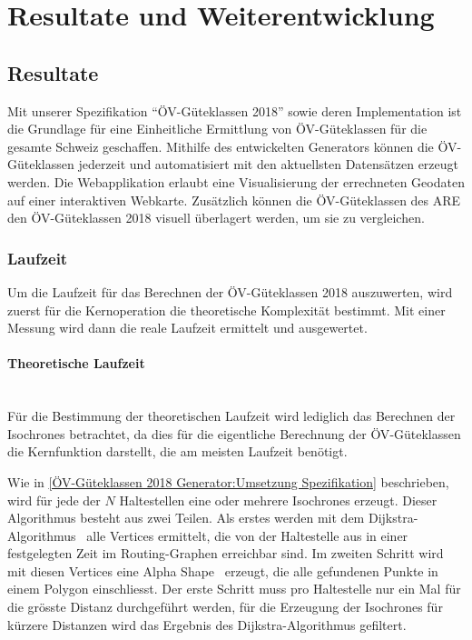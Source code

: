 
\section{Resultate und Weiterentwicklung}
\label{Resultate und Weiterentwicklung}


\subsection{Resultate}
\label{Resultate und Weiterentwicklung:Resultate}

Mit unserer Spezifikation "`\acs{ÖV}-Güteklassen 2018"' sowie deren Implementation ist die Grundlage für eine Einheitliche Ermittlung von \acs{ÖV}-Güteklassen für die gesamte Schweiz geschaffen.
Mithilfe des entwickelten Generators können die \acs{ÖV}-Güteklassen jederzeit und automatisiert mit den aktuellsten Datensätzen erzeugt werden.
Die Webapplikation erlaubt eine Visualisierung der errechneten Geodaten auf einer interaktiven Webkarte.
Zusätzlich können die \acs{ÖV}-Güteklassen des \ac{ARE} den \acs{ÖV}-Güteklassen 2018 visuell überlagert werden, um sie zu vergleichen.


\subsubsection{Laufzeit}
\label{Resultate und Weiterentwicklung:Laufzeit}

Um die Laufzeit für das Berechnen der \acs{ÖV}-Güteklassen 2018 auszuwerten, wird zuerst für die Kernoperation die theoretische Komplexität bestimmt.
Mit einer Messung wird dann die reale Laufzeit ermittelt und ausgewertet.

\paragraph{Theoretische Laufzeit}\label{Laufzeit:Theoretische Laufzeit}~\\
Für die Bestimmung der theoretischen Laufzeit wird lediglich das Berechnen der \glspl{Isochrone} betrachtet, da dies für die eigentliche Berechnung der \acs{ÖV}-Güteklassen die Kernfunktion darstellt, die am meisten Laufzeit benötigt.

Wie in \ref{ÖV-Güteklassen 2018 Generator:Umsetzung Spezifikation} beschrieben, wird für jede der $N$ Haltestellen eine oder mehrere \glspl{Isochrone} erzeugt.
Dieser Algorithmus besteht aus zwei Teilen.
Als erstes werden mit dem Dijkstra-Algorithmus~\cite{dijkstra_algorithm} alle Vertices ermittelt, die von der Haltestelle aus in einer festgelegten Zeit im Routing-Graphen erreichbar sind.
Im zweiten Schritt wird mit diesen Vertices eine Alpha Shape~\cite{alpha_shapes} erzeugt, die alle gefundenen Punkte in einem Polygon einschliesst.
Der erste Schritt muss pro Haltestelle nur ein Mal für die grösste Distanz durchgeführt werden, für die Erzeugung der \glspl{Isochrone} für kürzere Distanzen wird das Ergebnis des Dijkstra-Algorithmus gefiltert.

